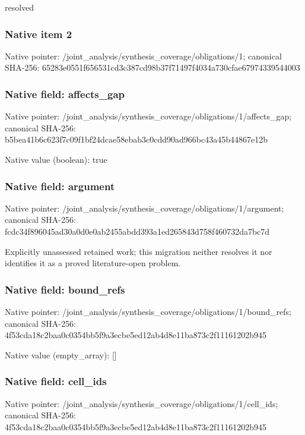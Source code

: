 \documentclass[10pt,a4paper]{article}
\begin{document}
\begingroup\raggedright\sloppy resolved\par\endgroup

\subsubsection{Native item 2}
Native pointer: /joint\_\allowbreak{}analysis/synthesis\_\allowbreak{}coverage/obligations/1; canonical SHA-256: 65283e0551f656531cd3c387cd98b37f71497f4034a730cfae67974339544003

\subsubsection{Native field: affects\_\allowbreak{}gap}
Native pointer: /joint\_\allowbreak{}analysis/synthesis\_\allowbreak{}coverage/obligations/1/affects\_\allowbreak{}gap; canonical SHA-256: b5bea41b6c623f7c09f1bf24dcae58ebab3c0cdd90ad966bc43a45b44867e12b

Native value (boolean): true

\subsubsection{Native field: argument}
Native pointer: /joint\_\allowbreak{}analysis/synthesis\_\allowbreak{}coverage/obligations/1/argument; canonical SHA-256: fcdc34f896045ad30a0d0e0ab2455abdd393a1ed265843d758f460732da7bc7d

\begingroup\raggedright\sloppy Explicitly unassessed retained work;\allowbreak{} this migration neither resolves it nor identifies it as a proved literature-open problem.\par\endgroup

\subsubsection{Native field: bound\_\allowbreak{}refs}
Native pointer: /joint\_\allowbreak{}analysis/synthesis\_\allowbreak{}coverage/obligations/1/bound\_\allowbreak{}refs; canonical SHA-256: 4f53cda18c2baa0c0354bb5f9a3ecbe5ed12ab4d8e11ba873c2f11161202b945

Native value (empty\_\allowbreak{}array): []

\subsubsection{Native field: cell\_\allowbreak{}ids}
Native pointer: /joint\_\allowbreak{}analysis/synthesis\_\allowbreak{}coverage/obligations/1/cell\_\allowbreak{}ids; canonical SHA-256: 4f53cda18c2baa0c0354bb5f9a3ecbe5ed12ab4d8e11ba873c2f11161202b945
\end{document}
